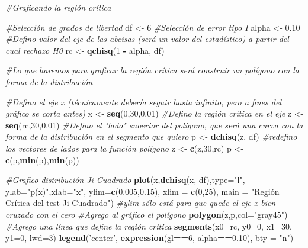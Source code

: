 \documentclass[]{article}
\newenvironment{Shaded}{\begin{snugshade}}{\end{snugshade}}
\newcommand{\CommentTok}[1]{\textcolor[rgb]{0.56,0.35,0.01}{\textit{#1}}}
\newcommand{\DataTypeTok}[1]{\textcolor[rgb]{0.13,0.29,0.53}{#1}}
\newcommand{\DecValTok}[1]{\textcolor[rgb]{0.00,0.00,0.81}{#1}}
\newcommand{\FloatTok}[1]{\textcolor[rgb]{0.00,0.00,0.81}{#1}}
\newcommand{\KeywordTok}[1]{\textcolor[rgb]{0.13,0.29,0.53}{\textbf{#1}}}
\newcommand{\NormalTok}[1]{#1}
\newcommand{\OperatorTok}[1]{\textcolor[rgb]{0.81,0.36,0.00}{\textbf{#1}}}
\newcommand{\StringTok}[1]{\textcolor[rgb]{0.31,0.60,0.02}{#1}}
\begin{document}
\begin{Shaded}
\begin{Highlighting}[]
  \CommentTok{#Graficando la región crítica}
  
  \CommentTok{#Selección de grados de libertad}
\NormalTok{  df <-}\StringTok{ }\DecValTok{6}
  \CommentTok{#Selección de error tipo I}
\NormalTok{  alpha <-}\StringTok{ }\FloatTok{0.10}
  \CommentTok{#Defino valor del eje de las abcisas (será un valor del estadístico) a partir del cual rechazo H0 }
\NormalTok{  rc <-}\StringTok{ }\KeywordTok{qchisq}\NormalTok{(}\DecValTok{1} \OperatorTok{-}\StringTok{ }\NormalTok{alpha, df)}
  
  \CommentTok{#Lo que haremos para graficar la región crítica será construir un polígono con la forma de la distribución}
  
  \CommentTok{#Defino el eje x (técnicamente debería seguir hasta infinito, pero a fines del gráfico se corta antes)}
\NormalTok{  x <-}\StringTok{ }\KeywordTok{seq}\NormalTok{(}\DecValTok{0}\NormalTok{,}\DecValTok{30}\NormalTok{,}\FloatTok{0.01}\NormalTok{)}
  \CommentTok{#Defino la región crítica en el eje}
\NormalTok{  z <-}\StringTok{ }\KeywordTok{seq}\NormalTok{(rc,}\DecValTok{30}\NormalTok{,}\FloatTok{0.01}\NormalTok{)}
  \CommentTok{#Defino el "lado" suoerior del polígono, que será una curva con la forma de la distribución en el segmento que quiero}
\NormalTok{  p <-}\StringTok{ }\KeywordTok{dchisq}\NormalTok{(z, df)}
  \CommentTok{#redefino los vectores de lados para la función polígono }
\NormalTok{  z <-}\StringTok{ }\KeywordTok{c}\NormalTok{(z,}\DecValTok{30}\NormalTok{,rc)}
\NormalTok{  p <-}\StringTok{ }\KeywordTok{c}\NormalTok{(p,}\KeywordTok{min}\NormalTok{(p),}\KeywordTok{min}\NormalTok{(p))}
  
  \CommentTok{#Grafico distribución Ji-Cuadrado}
  \KeywordTok{plot}\NormalTok{(x,}\KeywordTok{dchisq}\NormalTok{(x, df),}\DataTypeTok{type=}\StringTok{"l"}\NormalTok{,}
       \DataTypeTok{ylab=}\StringTok{"p(x)"}\NormalTok{,}\DataTypeTok{xlab=}\StringTok{"x"}\NormalTok{, }
       \DataTypeTok{ylim=}\KeywordTok{c}\NormalTok{(}\FloatTok{0.005}\NormalTok{,}\FloatTok{0.15}\NormalTok{), }\DataTypeTok{xlim =} \KeywordTok{c}\NormalTok{(}\DecValTok{0}\NormalTok{,}\DecValTok{25}\NormalTok{),}
       \DataTypeTok{main =} \StringTok{"Región Crítica del test Ji-Cuadrado"}\NormalTok{) }
  \CommentTok{#ylim sólo está para que quede el eje x bien cruzado con el cero}
  \CommentTok{#Agrego al gráfico el polígono}
  \KeywordTok{polygon}\NormalTok{(z,p,}\DataTypeTok{col=}\StringTok{"gray45"}\NormalTok{)}
  \CommentTok{#Agrego una línea que define la región crítica}
  \KeywordTok{segments}\NormalTok{(}\DataTypeTok{x0=}\NormalTok{rc, }\DataTypeTok{y0=}\DecValTok{0}\NormalTok{, }\DataTypeTok{x1=}\DecValTok{30}\NormalTok{, }\DataTypeTok{y1=}\DecValTok{0}\NormalTok{, }\DataTypeTok{lwd=}\DecValTok{3}\NormalTok{)}
    \KeywordTok{legend}\NormalTok{(}\StringTok{'center'}\NormalTok{,}
         \KeywordTok{expression}\NormalTok{(gl}\OperatorTok{==}\DecValTok{6}\NormalTok{, alpha}\OperatorTok{==}\FloatTok{0.10}\NormalTok{),}
         \DataTypeTok{bty =} \StringTok{"n"}\NormalTok{)}
\end{Highlighting}
\end{Shaded}
\end{document}
